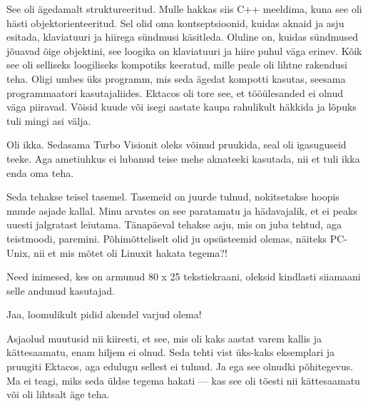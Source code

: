
See oli ägedamalt struktureeritud. Mulle hakkas siis 
C++ meeldima, kuna see oli hästi objektorienteeritud. Sel olid 
oma kontseptsioonid, kuidas aknaid ja asju esitada, klaviatuuri ja hiirega 
sündmusi käsitleda. Oluline on, kuidas sündmused jõuavad õige objektini, see loogika on klaviatuuri 
ja hiire puhul väga erinev. Kõik see oli selliseks loogiliseks kompotiks keeratud, mille peale oli lihtne rakendusi teha. Oligi umbes üks programm, mis seda ägedat kompotti kasutas, seesama programmaatori kasutajaliides. Ektacos oli tore see, et 
tööülesanded ei olnud väga piiravad. Võisid kuude või isegi aastate kaupa rahulikult häkkida ja lõpuks tuli mingi asi 
välja. 


Oli ikka. Sedasama Turbo Visionit oleks võinud pruukida, seal oli 
igasuguseid teeke. Aga ametiuhkus ei lubanud 
teise mehe aknateeki kasutada, nii et tuli ikka enda oma teha. 


Seda tehakse teisel tasemel. Tasemeid on juurde tulnud, 
nokitsetakse hoopis muude asjade kallal. Minu arvates on see
paratamatu ja hädavajalik, et ei peaks uuesti
jalgratast leiutama. Tänapäeval tehakse asju, mis on juba tehtud, aga teistmoodi, 
paremini. Põhimõtteliselt olid ju opsüsteemid olemas, näiteks PC-Unix, nii et mis mõtet oli 
Linuxit hakata tegema?! 



Need inimesed, kes on armunud 80 x 25 tekstiekraani, oleksid kindlasti siiamaani selle andunud kasutajad. 


Jaa, loomulikult pidid akendel varjud olema!


Asjaolud muutusid nii kiiresti, et see, mis oli kaks aastat varem kallis ja kättesaamatu, enam hiljem ei olnud. Seda tehti vist üks-kaks eksemplari ja pruugiti Ektacos, aga edulugu sellest ei tulnud. Ja ega see olnudki põhitegevus. 
Ma ei teagi, miks seda üldse tegema hakati --- kas see oli tõesti 
nii kättesaamatu või oli lihtsalt äge teha.

